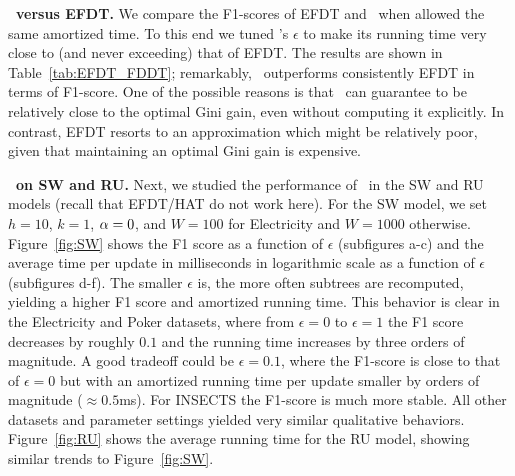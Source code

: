 
\noindent \textbf{\algo\ versus EFDT.} We compare the F1-scores of EFDT and \algo\ when allowed the same amortized time. To this end we tuned \algo's $\epsilon$ to make its running time very close to (and never exceeding) that of EFDT. The results are shown in Table~\ref{tab:EFDT_FDDT}; remarkably, \algo\ outperforms consistently EFDT in terms of F1-score. One of the possible reasons is that \algo\ can guarantee to be relatively close to the optimal Gini gain, even without computing it explicitly. In contrast, EFDT resorts to an approximation which might be relatively poor, given that maintaining an optimal Gini gain is expensive. 

\noindent \textbf{\algo\ on SW and RU.} Next, we studied the performance of \algo\ in the SW and RU models (recall that EFDT/HAT do not work here). For the SW model, we set $h=10$, $k=1$, $\alpha=0$, and $W=100$ for Electricity and $W=1000$ otherwise. Figure~\ref{fig:SW} shows the F1 score as a function of $\epsilon$ (subfigures a-c) and the average time per update in milliseconds in logarithmic scale as a function of $\epsilon$ (subfigures d-f). The smaller $\epsilon$ is, the more often subtrees are recomputed, yielding a higher F1 score and amortized running time. This behavior is clear in the Electricity and Poker datasets, where from $\epsilon=0$ to $\epsilon=1$ the F1 score decreases by roughly $0.1$ and the running time increases by three orders of magnitude. A good tradeoff could be $\epsilon=0.1$, where the F1-score is close to that of $\epsilon=0$ but with an amortized running time per update smaller by orders of magnitude ($\approx 0.5$ms). For INSECTS the F1-score is much more stable. All other datasets and parameter settings yielded very similar qualitative behaviors. Figure~\ref{fig:RU} shows the average running time for the RU model, showing similar trends to Figure~\ref{fig:SW}. %

